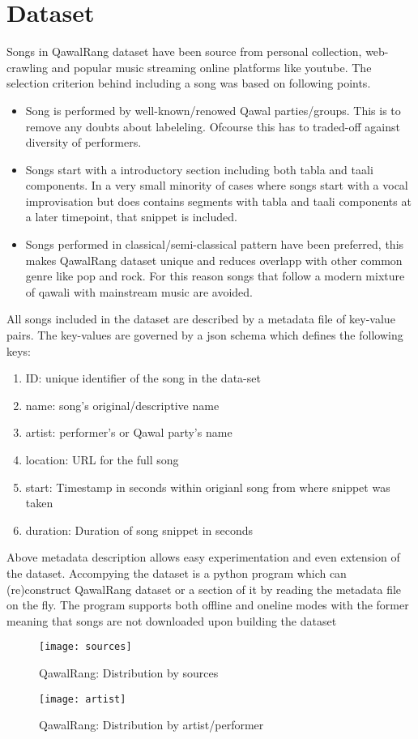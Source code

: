\documentclass{article}
\begin{document}
\section{Dataset}\label{sec:data}
Songs in QawalRang dataset have been source from personal collection, web-crawling and popular music streaming online platforms like youtube. The selection criterion behind including a song was based on following points.
\begin{itemize}
\item Song is performed by well-known/renowed Qawal parties/groups. This is to remove any doubts about labeleling. Ofcourse this has to traded-off against diversity of performers.
\item Songs start with a introductory section including both tabla and taali components. In a very small minority of cases where songs start with a vocal improvisation but does contains segments with tabla and taali components at a later timepoint, that snippet is included.
\item Songs performed in classical/semi-classical pattern have been preferred, this makes QawalRang dataset unique and reduces overlapp with other common genre like pop and rock. For this reason songs that follow a modern mixture of qawali with mainstream music are avoided.
\end{itemize}

All songs included in the dataset are described by a metadata file of key-value pairs. The key-values are governed by a json schema which defines the following keys:
\begin{enumerate}
\item ID: unique identifier of the song in the data-set
\item name: song's original/descriptive name
\item artist: performer's or Qawal party's name
\item location: URL for the full song
\item start: Timestamp in seconds within origianl song from where snippet was taken
\item duration: Duration of song snippet in seconds
\end{enumerate}
Above metadata description allows easy experimentation and even extension of the dataset. Accompying the dataset is a python program which can (re)construct QawalRang dataset or a section of it by reading the metadata file on the fly. The program supports both offline and oneline modes with the former meaning that songs are not downloaded upon building the dataset
\begin{figure}[htbp]
  \centering
  \texttt{[image: sources]}
  \caption{QawalRang: Distribution by sources}
\label{fig:figure}
\end{figure}
\begin{figure}[htbp]
  \centering
  \texttt{[image: artist]}
  \caption{QawalRang: Distribution by artist/performer}
\label{fig:figure}
\end{figure}
\end{document}

